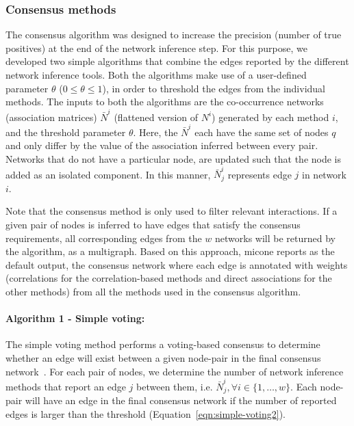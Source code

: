 \documentclass[letterpaper,12pt]{article}
\begin{document}
  \subsubsection*{Consensus methods}
  \vspace{-5mm}
  The consensus algorithm was designed to increase the precision (number of true positives) at the end of the network inference step.
  For this purpose, we developed two simple algorithms that combine the edges reported by the different network inference tools.
  Both the algorithms make use of a user-defined parameter $\theta$ ($0 \leq \theta \leq 1$), in order to threshold the edges from the individual methods.
  The inputs to both the algorithms are the co-occurrence networks (association matrices) $\bar{N}^i$ (flattened version of $N^{i}$) generated by each method $i$, and the threshold parameter $\theta$.
  Here, the $\bar{N}^{i}$ each have the same set of nodes $q$ and only differ by the value of the association inferred between every pair.
  Networks that do not have a particular node, are updated such that the node is added as an isolated component.
  In this manner, $\bar{N}^{i}_j$ represents edge $j$ in network $i$.

    Note that the consensus method is only used to filter relevant interactions.
    If a given pair of nodes is inferred to have edges that satisfy the consensus requirements, all corresponding edges from the $w$ networks will be returned by the algorithm, as a multigraph.
    Based on this approach, \ac{micone} reports as the default output, the consensus network where each edge is annotated with weights (correlations for the correlation-based methods and direct associations for the other methods) from all the methods used in the consensus algorithm.

  \paragraph*{Algorithm 1 - Simple voting:}
  The simple voting method performs a voting-based consensus to determine whether an edge will exist between a given node-pair in the final consensus network~\cite{bustinceFuzzySetsTheir2008,tsarevApplicationMajorityVoting2018}.
  For each pair of nodes, we determine the number of network inference methods that report an edge $j$ between them, i.e. $\bar{N}^{i}_{j}, \forall i \in \{1,\dots,w\}$.
  Each node-pair will have an edge in the final consensus network if the number of reported edges is larger than the threshold (Equation~\ref{eqn:simple-voting2}).
\end{document}

